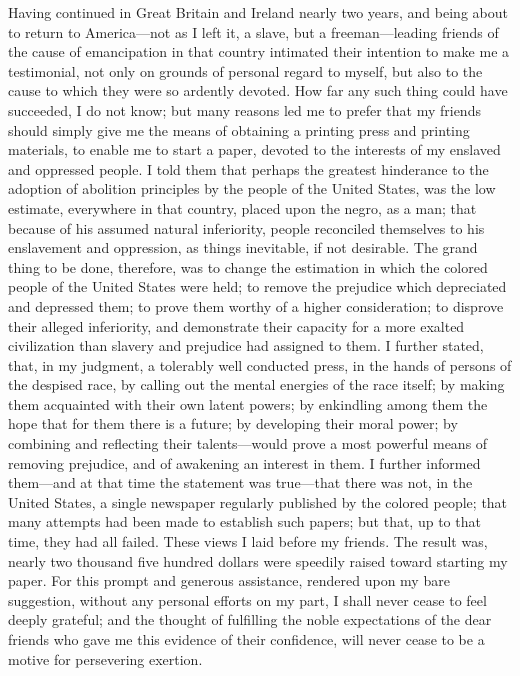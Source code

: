 Having continued in Great Britain and Ireland nearly two years, and
being about to return to America---not as I left it, a slave, but a
freeman---leading friends of the cause of emancipation in that country
intimated their intention to make me a testimonial, not only on grounds
of personal regard to myself, but also to the cause to which they were
so ardently devoted. How far any such thing could have succeeded, I do
not know; but many reasons led me to prefer that my friends should
simply give me the means of obtaining a printing press and printing
materials, to enable me to start a paper, devoted to the interests of my
enslaved and oppressed people. I {\protect\hypertarget{389}{}{}}told
them that perhaps the greatest hinderance to the adoption of abolition
principles by the people of the United States, was the low estimate,
everywhere in that country, placed upon the negro, as a man; that
because of his assumed natural inferiority, people reconciled themselves
to his enslavement and oppression, as things inevitable, if not
desirable. The grand thing to be done, therefore, was to change the
estimation in which the colored people of the United States were held;
to remove the prejudice which depreciated and depressed them; to prove
them worthy of a higher consideration; to disprove their alleged
inferiority, and demonstrate their capacity for a more exalted
civilization than slavery and prejudice had assigned to them. I further
stated, that, in my judgment, a tolerably well conducted press, in the
hands of persons of the despised race, by calling out the mental
energies of the race itself; by making them acquainted with their own
latent powers; by enkindling among them the hope that for them there is
a future; by developing their moral power; by combining and reflecting
their talents---would prove a most powerful means of removing prejudice,
and of awakening an interest in them. I further informed them---and at
that time the statement was true---that there was not, in the United
States, a single newspaper regularly published by the colored people;
that many attempts had been made to establish such papers; but that, up
to that time, they had all failed. These views I laid before my friends.
The result was, nearly two thousand five hundred dollars were speedily
raised toward starting my paper. For this
{\protect\hypertarget{390}{}{}}prompt and generous assistance, rendered
upon my bare suggestion, without any personal efforts on my part, I
shall never cease to feel deeply grateful; and the thought of fulfilling
the noble expectations of the dear friends who gave me this evidence of
their confidence, will never cease to be a motive for persevering
exertion.

